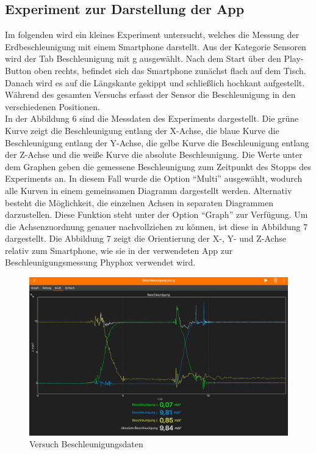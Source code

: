 \subsection{Experiment zur Darstellung der App}
\noindent Im folgenden wird ein kleines Experiment untersucht, welches die Messung der Erdbeschleunigung mit einem Smartphone darstellt. Aus der Kategorie Sensoren wird der Tab Beschleunigung mit g ausgewählt. Nach dem Start über den Play-Button oben rechts, befindet sich das Smartphone zunächst flach auf dem Tisch. Danach wird es auf die Längskante gekippt und schließlich hochkant aufgestellt. Während des gesamten Versuchs erfasst der Sensor die Beschleunigung in den verschiedenen Positionen.
\\
\noindent In der Abbildung 6 sind die Messdaten des Experiments dargestellt. Die grüne Kurve zeigt die Beschleunigung entlang der X-Achse, die blaue Kurve die Beschleunigung entlang der Y-Achse, die gelbe Kurve die Beschleunigung entlang der Z-Achse und die weiße Kurve die absolute Beschleunigung. Die Werte unter dem Graphen geben die gemessene Beschleunigung zum Zeitpunkt des Stopps des Experiments an. In diesem Fall wurde die Option “Multi” ausgewählt, wodurch alle Kurven in einem gemeinsamen Diagramm dargestellt werden. Alternativ besteht die Möglichkeit, die einzelnen Achsen in separaten Diagrammen darzustellen. Diese Funktion steht unter der Option “Graph” zur Verfügung. 
\noindent Um die Achsenzuordnung genauer nachvollziehen zu können, ist diese in Abbildung 7 dargestellt. Die Abbildung 7 zeigt die Orientierung der X-, Y- und Z-Achse relativ zum Smartphone, wie sie in der verwendeten App zur Beschleunigungsmessung Phyphox verwendet wird.
\\
\begin{figure}[ht]\centering
\includegraphics[width=0.75\linewidth]{images/Beschleunigung.jpeg}
\caption{Versuch Beschleunigungsdaten \cite{Phyphox}}
\label{fig:Versuch Beschleunigungsdaten}
\end{figure}
